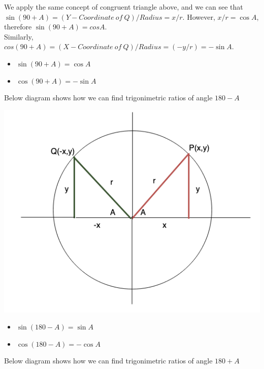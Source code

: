 \documentclass{book}
\begin{document}
	
	We apply the same concept of congruent triangle above, and we can see that $\sin(90+A) = (Y-Coordinate \: of \: Q)/Radius = x/r$. However, $x/r = \cos{A}$, therefore $\sin(90+A)=cos{A}$. \\
	Similarly, $cos(90+A) = (X-Coordinate \: of \: Q)/Radius = (-y/r) = -\sin{A}$. \\
	
	\begin{mdframed}[backgroundcolor=yellow]
		\begin{itemize}
			\item$\sin(90+A) = \cos{A}$
			\item $\cos(90+A) = -\sin{A}$
			
		\end{itemize}
	\end{mdframed}

	Below diagram shows how we can find trigonimetric ratios of angle $180-A$
	
	\includegraphics[scale=0.6]{180theta}
	
		\begin{mdframed}[backgroundcolor=yellow]
			\begin{itemize}
				\item$\sin(180-A) = \sin{A}$
				\item $\cos(180-A) = -\cos{A}$
				
			\end{itemize}
		\end{mdframed}
		
	Below diagram shows how we can find trigonimetric ratios of angle $180+A$
	
\end{document}
